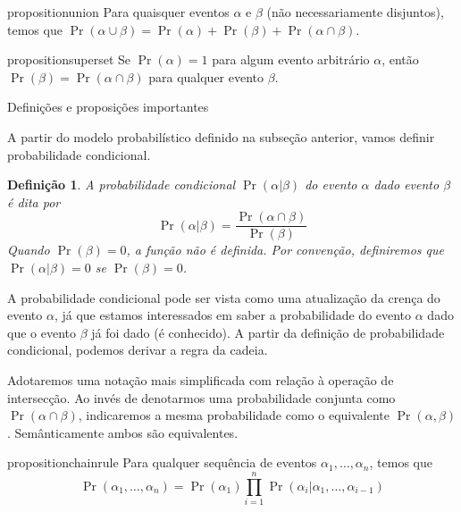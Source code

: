 \documentclass{amsart}
\makeatletter
\def\subsection{\@startsection{subsection}{3}%
  \z@{.5\linespacing\@plus.7\linespacing}{.1\linespacing}%
  {\normalfont\itshape}}
\theoremstyle{plain}
\newcounter{dummy-def}\numberwithin{dummy-def}{subsection}
\newtheorem{definition}[dummy-def]{Definição}
\newcounter{dummy-thm}\numberwithin{dummy-thm}{subsection}
\newcounter{dummy-prop}\numberwithin{dummy-prop}{subsection}
\newcounter{dummy-ex}\numberwithin{dummy-ex}{subsection}
\newcounter{dummy-eg}\numberwithin{dummy-eg}{subsection}
\numberwithin{equation}{subsection}
\makeatother
\begin{document}
\begin{restatable}{proposition}{union}\label{prop:union}
  Para quaisquer eventos $\alpha$ e $\beta$ (não necessariamente disjuntos), temos que $\Pr(\alpha
  \cup\beta)=\Pr(\alpha)+\Pr(\beta)+\Pr(\alpha\cap\beta)$.
\end{restatable}

\begin{restatable}{proposition}{superset}\label{prop:superset}
  Se $\Pr(\alpha)=1$ para algum evento arbitrário $\alpha$, então $\Pr(\beta)=\Pr(\alpha\cap\beta)$
  para qualquer evento $\beta$.
\end{restatable}

\subsection{Definições e proposições importantes}

A partir do modelo probabilístico definido na subseção anterior, vamos definir probabilidade
condicional.

\begin{definition}
  A probabilidade condicional $\Pr(\alpha|\beta)$ do evento $\alpha$ dado evento $\beta$ é dita por
  \begin{equation}
    \Pr(\alpha|\beta)=\frac{\Pr(\alpha\cap\beta)}{\Pr(\beta)}
  \end{equation}
  Quando $\Pr(\beta)=0$, a função não é definida. Por convenção, definiremos que
  $\Pr(\alpha|\beta)=0$ se $\Pr(\beta)=0$.
\end{definition}

A probabilidade condicional pode ser vista como uma atualização da crença do evento $\alpha$, já
que estamos interessados em saber a probabilidade do evento $\alpha$ dado que o evento $\beta$ já
foi dado (é conhecido). A partir da definição de probabilidade condicional, podemos derivar a regra
da cadeia.

Adotaremos uma notação mais simplificada com relação à operação de intersecção. Ao invés de
denotarmos uma probabilidade conjunta como $\Pr(\alpha\cap\beta)$, indicaremos a mesma
probabilidade como o equivalente $\Pr(\alpha,\beta)$. Semânticamente ambos são equivalentes.

\begin{restatable}{proposition}{chainrule}\label{prop:chain-rule}
  Para qualquer sequência de eventos $\alpha_1,\ldots,\alpha_n$, temos que
  \begin{equation}
    \Pr(\alpha_1,\ldots,\alpha_n)=\Pr(\alpha_1)\prod_{i=1}^n \Pr(\alpha_i|\alpha_1,\ldots,
    \alpha_{i-1})
  \end{equation}
\end{restatable}
\end{document}
